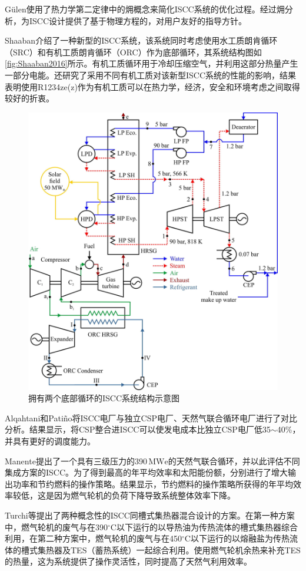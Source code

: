 G\"{u}len\cite{Gulen2015}使用了热力学第二定律中的㶲概念来简化ISCC系统的优化过程。经过㶲分析，为ISCC设计提供了基于物理方程的，对用户友好的指导方针。

Shaaban\cite{Shaaban2016}介绍了一种新型的ISCC系统，该系统同时考虑使用水工质朗肯循环（SRC）和有机工质朗肯循环（ORC）作为底部循环，其系统结构图如\autoref{fig:Shaaban2016}所示。有机工质循环用于冷却压缩空气，并利用这部分热量产生一部分电能。还研究了采用不同有机工质对该新型ISCC系统的性能的影响，结果表明使用R1234ze(z)作为有机工质可以在热力学，经济，安全和环境考虑之间取得较好的折衷。
\begin{figure}[!ht]
\centering
\includegraphics[width=.8\textwidth]{fig/Shaaban2016.jpg}
\caption{拥有两个底部循环的ISCC系统结构示意图}\label{fig:Shaaban2016}
\end{figure}

Alqahtani和Pati\~{n}o\cite{Alqahtani2016}将ISCC电厂与独立CSP电厂、天然气联合循环电厂进行了对比分析。结果显示，将CSP整合进ISCC可以使发电成本比独立CSP电厂低35$\sim$40\%，并具有更好的调度能力。

Manente\cite{Manente2016}提出了一个具有三级压力的390$\,\mathrm{MWe}$的天然气联合循环，并以此评估不同集成方案的ISCC。为了得到最高的年平均效率和太阳能份额，分别进行了增大输出功率和节约燃料的操作策略。结果显示，节约燃料的操作策略所获得的年平均效率较低，这是因为燃气轮机的负荷下降导致系统整体效率下降。

Turchi等\cite{Turchi2014}提出了两种概念性的ISCC同槽式集热器混合设计的方案。在第一种方案中，燃气轮机的废气与在390$^\circ\mathrm{C}$以下运行的以导热油为传热流体的槽式集热器综合利用，在第二种方案中，燃气轮机的废气与在450$^\circ\mathrm{C}$以下运行的以熔融盐为传热流体的槽式集热器及TES（蓄热系统）一起综合利用。使用燃气轮机余热来补充TES的热量，这为系统提供了操作灵活性，同时提高了天然气利用效率。


